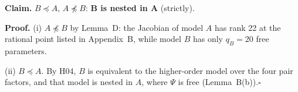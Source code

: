 \documentclass[10pt,a4paper]{article}
\newcommand{\nest}{\preceq}
\newcommand{\nnest}{\not\preceq}
\begin{document}
\par\bigskip
\noindent\textbf{Claim.} $B \nest A$, $A \nnest B$: \textbf{B is nested in A} (strictly).\par\smallskip
\noindent\textbf{Proof.} (i) $A\nnest B$ by Lemma~D: the Jacobian of model $A$ has rank 22 at the rational point listed in Appendix~B, while model $B$ has only $q_B=20$ free parameters.\par\smallskip
\noindent(ii) $B\nest A$. By H04, $B$ is equivalent to the higher-order model over the four pair factors, and that model is nested in $A$, where $\Psi$ is free (Lemma~B(b)).\hfill$\square$\par\medskip
{}

\clearpage
\end{document}

